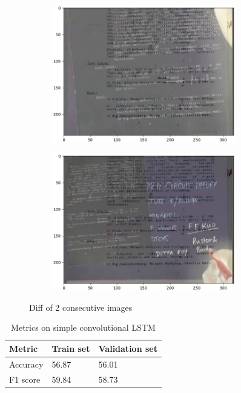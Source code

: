 \documentclass[journal]{IEEEtran}
\begin{document}
\begin{figure}[t!]
	\centering

	\begin{subfigure}{0.49\textwidth}
		\centering
		\includegraphics[height = 6cm]{Images/diff.png}
	\end{subfigure}
	\hspace{1mm}
	\begin{subfigure}{0.49\textwidth}
		\centering
		\includegraphics[height = 6cm]{Images/diff1.png}
	\end{subfigure}
	
	\caption{Diff of 2 consecutive images}
	\label{fig: diff}
\end{figure}

\begin{table}[H]
	\caption{Metrics on simple convolutional LSTM}
	\centering
	\begin{tabular}{lll}
		\toprule
		Metric & Train set & Validation set
		\\
		\midrule
		Accuracy & 56.87 & 56.01
		\\
		F1 score & 59.84 & 58.73
		\\
		\bottomrule
	\end{tabular}
	\label{tab: conv}
\end{table}
\end{document}
